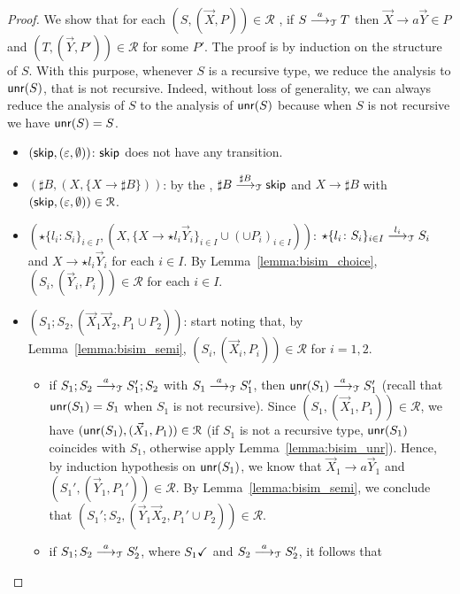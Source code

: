 \begin{proof}
	We show that for each $(S, (\vec X, P))\in \mathcal{R}$	, if
	$S \LTSderives[a] T$ then $\vec X \rightarrow a \vec Y\in P$
	and $(T, (\vec Y, P'))\in \mathcal{R}$ for some $P'$. The proof is by
	induction on the structure of $S$. With this purpose, whenever $S$ is a 
	recursive type, we reduce the analysis to $\Unravel(S)$, that
	is not recursive. Indeed, without loss of generality, 
	we can always reduce the analysis of $S$
	to the analysis of $\Unravel(S)$
	because when $S$ is not recursive we have
	$\Unravel(S)=S$.
	\begin{itemize}
		\item $(\skipk, (\varepsilon, \emptyset))$: $\skipk$ does not have any
		transition.
		\item $(\sharp B,(X,\{X \rightarrow \sharp B\}))$: by the \LTS,
		$\sharp B\LTSderives[\sharp B] \skipk$ and $X\rightarrow \sharp B$ with
		$(\skipk, (\varepsilon, \emptyset))\in \mathcal{R}$.
		\item $(\star\{l_i\colon S_i\}_{i\in I}, (X, \{X \rightarrow \star l_i
    	\vec Y_i\}_{i\in I} \cup (\cup  P_i)_{i\in I}))$: 
    	$\star\{l_i\colon S_i\}_{i\in I}\LTSderives[l_i] S_i$ and 
    	$X \rightarrow \star l_i \vec Y_i$ for each $i\in I$. By 
    	Lemma~\ref{lemma:bisim_choice}, $(S_i, (\vec Y_i,  P_i))\in\mathcal{R}$
    	for each $i\in I$. 
    	\item $(S_1;S_2, (\vec X_1\vec X_2,  P_1 \cup  P_2))$: start noting
    	that, by Lemma~\ref{lemma:bisim_semi}, 
    	$(S_i, (\vec X_i, P_i))\in \mathcal{R}$ for $i=1,2$. 
    	\begin{itemize}
    	\item if 
    	$S_1;S_2\LTSderives[a] S_1'; S_2$ with $S_1\LTSderives[a] S_1'$, then 
    	$\Unravel(S_1)\LTSderives[a] S_1'$ (recall that $\Unravel(S_1)=S_1$ when
    	$S_1$ is not recursive). 
    	Since $(S_1,(\vec X_1, P_1))\in\mathcal{R}$, we have
    	$(\Unravel(S_1), (\vec X_1, P_1))\in \mathcal{R}$ 
    	(if $S_1$ is not a recursive type, $\Unravel(S_1)$ 
    	coincides with $S_1$, otherwise apply Lemma~\ref{lemma:bisim_unr}).
    	Hence, by induction hypothesis on $\Unravel(S_1)$, we know that 
    	$\vec X_1 \rightarrow a \vec Y_1$ and 
    	$(S_1', (\vec Y_1,P_1'))\in \mathcal{R}$. 
    	By Lemma~\ref{lemma:bisim_semi}, we conclude that 
    	$(S_1';S_2, (\vec Y_1 \vec X_2,P_1'\cup P_2))\in \mathcal{R}$. 
    	\item if $S_1;S_2\LTSderives[a] S_2'$, where $\DONE{S_1}$ and 
    	$S_2\LTSderives[a] S_2'$, it follows that 

\end{itemize}
\end{itemize}
\end{proof}
